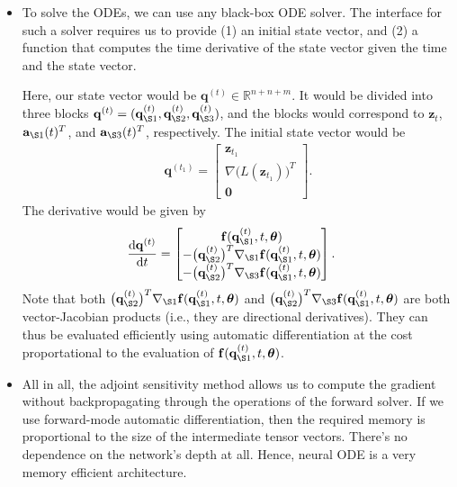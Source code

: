 \documentclass[10pt]{article}
\newcommand{\dee}{\mathrm{d}}
\newcommand{\ve}[1]{\mathbf{#1}}
\newcommand{\ves}[1]{\boldsymbol{#1}}
\newcommand{\Real}{\mathbb{R}}
\begin{document}
\begin{itemize}
  \item To solve the ODEs, we can use any black-box ODE solver. The interface for such a solver requires us to provide (1) an initial state vector, and (2) a function that computes the time derivative of the state vector given the time and the state vector. 
  
  Here, our state vector would be $\ve{q}^{(t)} \in \Real^{n+n+m}$. It would be divided into three blocks $\ve{q}^{(t)} = (\ve{q}^{(t)}_{\S 1}, \ve{q}^{(t)}_{\S 2}, \ve{q}^{(t)}_{\S 3})$, and the blocks would correspond to $\ve{z}_t$, $\ve{a}_{\S 1}(t)^T$, and $\ve{a}_{\S 3}(t)^T$, respectively. The initial state vector would be
  \begin{align*}
    \ve{q}^{(t_1)} = \begin{bmatrix}
      \ve{z}_{t_1} \\
      \nabla \big( L(\ve{z}_{t_1}) \big)^T \\
      \ve{0}
    \end{bmatrix}.
  \end{align*}
  The derivative would be given by
  \begin{align*}
    \frac{\dee \ve{q}^{(t)}}{\dee t}
    &= \begin{bmatrix}
      \ve{f}(\ve{q}_{\S 1}^{(t)}, t, \ves{\theta}) \\
      -\big( \ve{q}^{(t)}_{\S 2}\big)^T \nabla_{\S 1}\ve{f}(\ve{q}_{\S 1}^{(t)}, t, \ves{\theta}) \\
      -\big( \ve{q}^{(t)}_{\S 2} \big)^T \nabla_{\S 3}\ve{f}(\ve{q}_{\S 1}^{(t)}, t, \ves{\theta}) 
    \end{bmatrix}.
  \end{align*}
  Note that both $\big( \ve{q}^{(t)}_{\S 2}\big)^T \nabla_{\S 1}\ve{f}(\ve{q}_{\S 1}^{(t)}, t, \ves{\theta})$ and $\big( \ve{q}^{(t)}_{\S 2} \big)^T \nabla_{\S 3}\ve{f}(\ve{q}_{\S 1}^{(t)}, t, \ves{\theta})$ are both vector-Jacobian products (i.e., they are directional derivatives). They can thus be evaluated efficiently using automatic differentiation at the cost proportational to the evaluation of $\ve{f}(\ve{q}_{\S 1}^{(t)}, t, \ves{\theta})$.

  \item All in all, the adjoint sensitivity method allows us to compute the gradient without backpropagating through the operations of the forward solver. If we use forward-mode automatic differentiation, then the required memory is proportional to the size of the intermediate tensor vectors. There's no dependence on the network's depth at all. Hence, neural ODE is a very memory efficient architecture.
\end{itemize}
\end{document}
